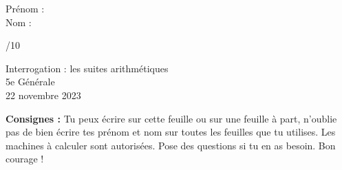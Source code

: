 


	\begin{minipage}[t]{.5\textwidth}
		{\large Prénom :\\
		Nom :}
	\end{minipage}%
	\begin{minipage}[t]{.5\textwidth}
		\begin{flushright}
			{\Large /10}
		\end{flushright}
	\end{minipage}

	\vspace{3em}
	\begin{center}
			{\Large Interrogation : les suites arithmétiques}\\
			{\large 5e Générale}\\
			22 novembre 2023
	\end{center}
	
	\vspace{3em}
	
	\textbf{Consignes :} Tu peux écrire sur cette feuille ou sur une feuille à part, n'oublie pas de bien écrire tes prénom et nom sur toutes les feuilles que tu utilises. Les machines à calculer sont autorisées. Pose des questions si tu en as besoin. Bon courage !
	
	\vspace{2em}
	
